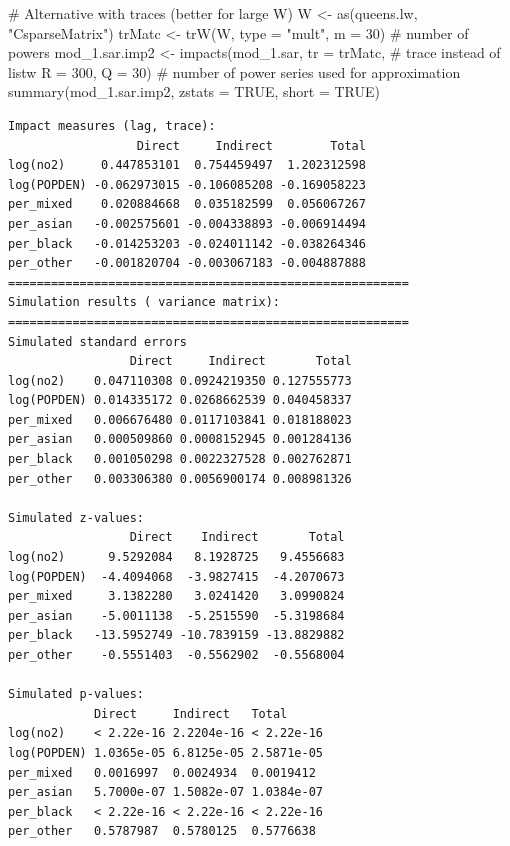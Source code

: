 \documentclass[
  letterpaper,
]{scrbook}
\newenvironment{Shaded}{\begin{snugshade}}{\end{snugshade}}
\newcommand{\AttributeTok}[1]{\textcolor[rgb]{0.40,0.45,0.13}{#1}}
\newcommand{\CommentTok}[1]{\textcolor[rgb]{0.37,0.37,0.37}{#1}}
\newcommand{\ConstantTok}[1]{\textcolor[rgb]{0.56,0.35,0.01}{#1}}
\newcommand{\DecValTok}[1]{\textcolor[rgb]{0.68,0.00,0.00}{#1}}
\newcommand{\FunctionTok}[1]{\textcolor[rgb]{0.28,0.35,0.67}{#1}}
\newcommand{\NormalTok}[1]{\textcolor[rgb]{0.00,0.23,0.31}{#1}}
\newcommand{\OtherTok}[1]{\textcolor[rgb]{0.00,0.23,0.31}{#1}}
\newcommand{\StringTok}[1]{\textcolor[rgb]{0.13,0.47,0.30}{#1}}
\begin{document}
\begin{Shaded}
\begin{Highlighting}[]
\CommentTok{\# Alternative with traces (better for large W)}
\NormalTok{W }\OtherTok{\textless{}{-}} \FunctionTok{as}\NormalTok{(queens.lw, }\StringTok{"CsparseMatrix"}\NormalTok{)}
\NormalTok{trMatc }\OtherTok{\textless{}{-}} \FunctionTok{trW}\NormalTok{(W, }\AttributeTok{type =} \StringTok{"mult"}\NormalTok{,}
              \AttributeTok{m =} \DecValTok{30}\NormalTok{) }\CommentTok{\# number of powers}
\NormalTok{mod\_1.sar.imp2 }\OtherTok{\textless{}{-}} \FunctionTok{impacts}\NormalTok{(mod\_1.sar, }
                          \AttributeTok{tr =}\NormalTok{ trMatc, }\CommentTok{\# trace instead of listw}
                          \AttributeTok{R =} \DecValTok{300}\NormalTok{, }
                          \AttributeTok{Q =} \DecValTok{30}\NormalTok{) }\CommentTok{\# number of power series used for approximation}
\FunctionTok{summary}\NormalTok{(mod\_1.sar.imp2, }\AttributeTok{zstats =} \ConstantTok{TRUE}\NormalTok{, }\AttributeTok{short =} \ConstantTok{TRUE}\NormalTok{)}
\end{Highlighting}
\end{Shaded}

\begin{verbatim}
Impact measures (lag, trace):
                  Direct     Indirect        Total
log(no2)     0.447853101  0.754459497  1.202312598
log(POPDEN) -0.062973015 -0.106085208 -0.169058223
per_mixed    0.020884668  0.035182599  0.056067267
per_asian   -0.002575601 -0.004338893 -0.006914494
per_black   -0.014253203 -0.024011142 -0.038264346
per_other   -0.001820704 -0.003067183 -0.004887888
========================================================
Simulation results ( variance matrix):
========================================================
Simulated standard errors
                 Direct     Indirect       Total
log(no2)    0.047110308 0.0924219350 0.127555773
log(POPDEN) 0.014335172 0.0268662539 0.040458337
per_mixed   0.006676480 0.0117103841 0.018188023
per_asian   0.000509860 0.0008152945 0.001284136
per_black   0.001050298 0.0022327528 0.002762871
per_other   0.003306380 0.0056900174 0.008981326

Simulated z-values:
                 Direct    Indirect       Total
log(no2)      9.5292084   8.1928725   9.4556683
log(POPDEN)  -4.4094068  -3.9827415  -4.2070673
per_mixed     3.1382280   3.0241420   3.0990824
per_asian    -5.0011138  -5.2515590  -5.3198684
per_black   -13.5952749 -10.7839159 -13.8829882
per_other    -0.5551403  -0.5562902  -0.5568004

Simulated p-values:
            Direct     Indirect   Total     
log(no2)    < 2.22e-16 2.2204e-16 < 2.22e-16
log(POPDEN) 1.0365e-05 6.8125e-05 2.5871e-05
per_mixed   0.0016997  0.0024934  0.0019412 
per_asian   5.7000e-07 1.5082e-07 1.0384e-07
per_black   < 2.22e-16 < 2.22e-16 < 2.22e-16
per_other   0.5787987  0.5780125  0.5776638 
\end{verbatim}
\end{document}

